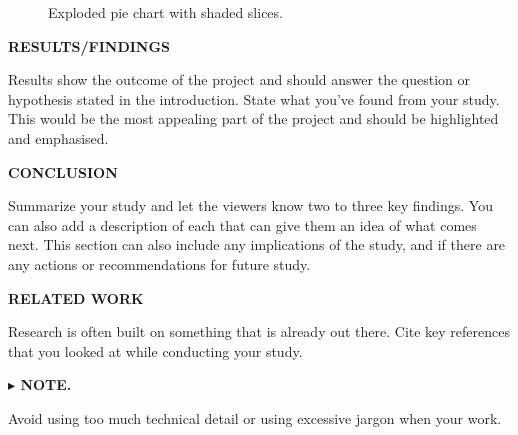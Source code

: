\documentclass[12pt]{article}
\newcommand{\btr}{\blacktriangleright}
\begin{document}
\begin{paracol}{2}
\begin{tcolorbox}[colback=off.white!80, colframe=off.white!80, arc=0.01mm]
\begin{multicols}{2}
\begin{figure}[H]
			
				\caption*{Exploded pie chart with shaded slices.}
			\end{figure}
		\end{multicols}
	\end{tcolorbox}
\medskip

	\begin{multicols}{3}
		{\large\textbf{RESULTS/FINDINGS}}\\
		\vspace{-0.3cm}

		Results show the outcome of the project and should answer the question or hypothesis
		stated in the introduction. State what you've found from your study. This would be
		the most appealing part of the project and should be highlighted and emphasised.

		\columnbreak

		{\large\textbf{CONCLUSION}}\\
		\vspace{-0.3cm}

		Summarize your study and let the viewers know two to three key findings. You can
		also add a description of each that can give them an idea of what comes next. This
		section can also include any implications of the study, and if there are any actions
		or recommendations for future study.

		\columnbreak

		{\large\textbf{RELATED WORK}}\\
		\vspace{-0.3cm}

		Research is often built on something that is already out there. Cite key references
		that you looked at while conducting your study.

		\begin{tcolorbox}[colback=paynes.grey, colframe=paynes.grey, arc=0.01mm]
			\color{off.white}
			{\footnotesize\textbf{$\btr$ NOTE.}}\\
			\vspace{-0.3cm}

			Avoid using too much technical detail or using excessive jargon when your work.
		\end{tcolorbox}
	\end{multicols}

\end{paracol}
\end{document}
